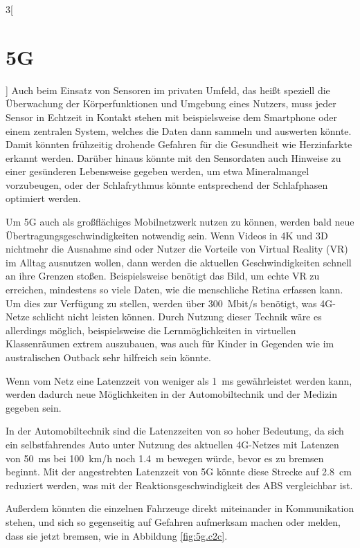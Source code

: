 \begin{multicols}{3}[\section{5G}]
Auch beim Einsatz von Sensoren im privaten Umfeld, das heißt speziell die Überwachung der Körperfunktionen und Umgebung eines Nutzers, muss jeder Sensor in Echtzeit in Kontakt stehen mit beispielsweise dem Smartphone oder einem zentralen System, welches die Daten dann sammeln und auswerten könnte. Damit könnten frühzeitig drohende Gefahren für die Gesundheit wie Herzinfarkte erkannt werden. Darüber hinaus könnte mit den Sensordaten auch Hinweise zu einer gesünderen Lebensweise gegeben werden, um etwa Mineralmangel vorzubeugen, oder der Schlafrythmus könnte entsprechend der Schlafphasen optimiert werden.

Um 5G auch als großflächiges Mobilnetzwerk nutzen zu können, werden bald neue Übertragungsgeschwindigkeiten notwendig sein. Wenn Videos in 4K und 3D nichtmehr die Ausnahme sind oder Nutzer die Vorteile von Virtual Reality (VR) im Alltag ausnutzen wollen, dann werden die aktuellen Geschwindigkeiten schnell an ihre Grenzen stoßen.
Beispielsweise benötigt das Bild, um echte VR zu erreichen, mindestens so viele Daten, wie die menschliche Retina erfassen kann. Um dies zur Verfügung zu stellen, werden über \SI{300}{\mega bit/\second} benötigt, was 4G-Netze schlicht nicht leisten können.
Durch Nutzung dieser Technik wäre es allerdings möglich, beispielsweise die Lernmöglichkeiten in virtuellen Klassenräumen extrem auszubauen, was auch für Kinder in Gegenden wie im australischen Outback sehr hilfreich sein könnte.

Wenn vom Netz eine Latenzzeit von weniger als \SI{1}{\milli\second} gewährleistet werden kann, werden dadurch neue Möglichkeiten in der Automobiltechnik und der Medizin gegeben sein.

In der Automobiltechnik sind die Latenzzeiten von so hoher Bedeutung, da sich ein selbstfahrendes Auto unter Nutzung des aktuellen 4G-Netzes mit Latenzen von \SI{50}{\milli\second} bei \SI{100}{\kilo\metre /\hour} noch \SI{1.4}{\metre} bewegen würde, bevor es zu bremsen beginnt. Mit der angestrebten Latenzzeit von 5G könnte diese Strecke auf \SI{2.8}{\centi\metre} reduziert werden, was mit der Reaktionsgeschwindigkeit des ABS vergleichbar ist.

Außerdem könnten die einzelnen Fahrzeuge direkt miteinander in Kommunikation stehen, und sich so gegenseitig auf Gefahren aufmerksam machen oder melden, dass sie jetzt bremsen, wie in Abbildung \ref{fig:5g.c2c}.
\end{multicols}
\newpage
